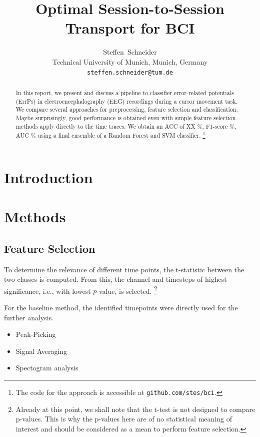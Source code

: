 \documentclass[10pt,a4paper]{article}
\title{Optimal Session-to-Session Transport for BCI}
\author{
  Steffen~Schneider\\
  Technical University of Munich, Munich, Germany\\
  \texttt{steffen.schneider@tum.de}
}
\begin{document}
\maketitle

\begin{abstract}
    In this report, we present and discuss a pipeline to classifier error-related potentials (ErrPs) in electroencephalography (EEG) recordings during a cursor movement task.
    We compare several approaches for preprocessing, feature selection and classification.
    Maybe surprisingly, good performance is obtained even with simple feature selection methods apply directly to the time traces.
    We obtain an ACC of XX \%, F1-score \%, AUC \% using a final ensemble of a Random Forest and SVM classifier.
    \footnote{The code for the approach is accessible at \texttt{github.com/stes/bci}.}
\end{abstract}

\section{Introduction}


\cite{Cuturi2013,Ehrlich2016,Flamary2016,Spuler2015,Chai2017,Bug2017,Martin2013,Lotte2014,Li,Pan,Courty,silvoni2011brain,millan2010combining,lebedev2006brain,Stober2015,Ioffe2015batch}

\section{Methods}

\subsection{Feature Selection}

To determine the relevance of different time points, the t-statistic between the two classes is computed.
From this, the channel and timesteps of highest significance, i.e., with lowest $p$-value, is selected.
\footnote{Already at this point, we shall note that the t-test is not designed to compare p-values.
This is why the p-values here are of no statistical meaning of interest and should be considered as a mean to perform feature selection.}

For the baseline method, the identified timepoints were directly used for the further analysis.

\begin{itemize}
    \item Peak-Picking
    \item Signal Averaging
    \item Spectogram analysis
\end{itemize}
\end{document}
